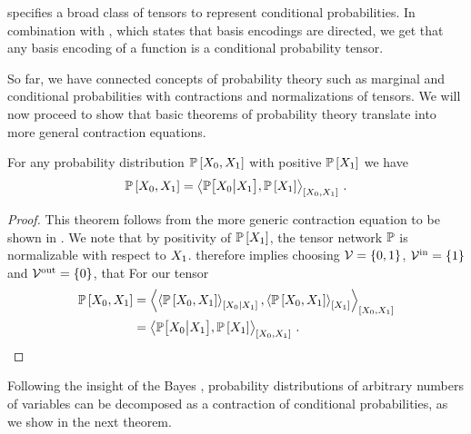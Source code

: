 %
 specifies a broad class of tensors to represent conditional probabilities.
In combination with , which states that basis encodings are directed, we get that any basis encoding of a function is a conditional probability tensor.



So far, we have connected concepts of probability theory such as marginal and conditional probabilities with contractions and normalizations of tensors.
We will now proceed to show that basic theorems of probability theory translate into more general contraction equations.

\begin{theorem}
    \label{the:bayes}
    For any probability distribution $\mathbb{P}\left[X_{0}, X_{1}\right]$ with positive $\mathbb{P}\left[X_{1}\right]$ we have
    \begin{align*}
        \mathbb{P}\left[X_{0},X_{1}\right]
        = \left\langle \mathbb{P}\big[X_{0}\big|X_{1}\big],\mathbb{P}\left[X_{1}\right]\right\rangle_{\left[ X_{0},X_{1} \right]} \, .
    \end{align*}
\end{theorem}
\begin{proof}
    This theorem follows from the more generic contraction equation  to be shown in .
    We note that by positivity of $\mathbb{P}\left[X_{1}\right]$, the tensor network $\mathbb{P}$ is normalizable with respect to $X_{1}$.
     therefore implies choosing $\mathcal{V}=\{0,1\}$, $\mathcal{V}^{\mathrm{in}}=\{1\}$ and $\mathcal{V}^{\mathrm{out}}=\{0\}$, that
    For our tensor
    \begin{align*}
        \mathbb{P}\left[X_{0},X_{1}\right]
        &=\left\langle 
            \left\langle \mathbb{P}\left[X_{0},X_{1}\right]\right\rangle_{\left[ X_{0} | X_{1} \right]},
            \left\langle \mathbb{P}\left[X_{0},X_{1}\right]\right\rangle_{\left[ X_{1} \right]}
        \right\rangle_{\left[ X_{0},X_{1} \right]} \\
        &=\left\langle \mathbb{P}\big[X_{0}\big|X_{1}\big],\mathbb{P}\left[X_{1}\right]\right\rangle_{\left[ X_{0},X_{1} \right]} \, . \qedhere
    \end{align*}
\end{proof}

Following the insight of the Bayes , probability distributions of arbitrary numbers of variables can be decomposed as a contraction of conditional probabilities, as we show in the next theorem.

